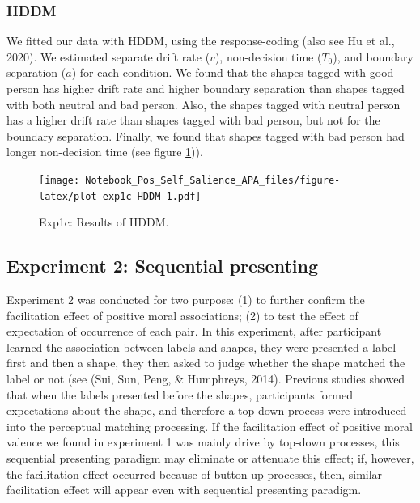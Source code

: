 \documentclass[
  english,
  man]{apa6}
\begin{document}
\hypertarget{hddm-2}{%
\subsubsection{HDDM}\label{hddm-2}}

We fitted our data with HDDM, using the response-coding (also see Hu et al., 2020). We estimated separate drift rate (\(v\)), non-decision time (\(T_{0}\)), and boundary separation (\(a\)) for each condition. We found that the shapes tagged with good person has higher drift rate and higher boundary separation than shapes tagged with both neutral and bad person. Also, the shapes tagged with neutral person has a higher drift rate than shapes tagged with bad person, but not for the boundary separation. Finally, we found that shapes tagged with bad person had longer non-decision time (see figure \ref{fig:plot-exp1c-HDDM})).

\begin{figure}
\centering
\texttt{[image: Notebook\_Pos\_Self\_Salience\_APA\_files/figure-latex/plot-exp1c-HDDM-1.pdf]}
\caption{\label{fig:plot-exp1c-HDDM}Exp1c: Results of HDDM.}
\end{figure}

\hypertarget{experiment-2-sequential-presenting}{%
\subsection{Experiment 2: Sequential presenting}\label{experiment-2-sequential-presenting}}

Experiment 2 was conducted for two purpose: (1) to further confirm the facilitation effect of positive moral associations; (2) to test the effect of expectation of occurrence of each pair. In this experiment, after participant learned the association between labels and shapes, they were presented a label first and then a shape, they then asked to judge whether the shape matched the label or not (see (Sui, Sun, Peng, \& Humphreys, 2014). Previous studies showed that when the labels presented before the shapes, participants formed expectations about the shape, and therefore a top-down process were introduced into the perceptual matching processing. If the facilitation effect of positive moral valence we found in experiment 1 was mainly drive by top-down processes, this sequential presenting paradigm may eliminate or attenuate this effect; if, however, the facilitation effect occurred because of button-up processes, then, similar facilitation effect will appear even with sequential presenting paradigm.
\end{document}
